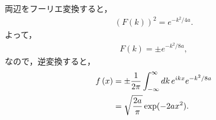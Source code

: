 両辺をフーリエ変換すると，
\begin{align}
  \left(F\left(k\right)\right)^2 = e^{-k^2/4a}.
\end{align}
よって，
\begin{align}
  F\left(k\right) = \pm e^{-k^2/8a},
\end{align}
なので，逆変換すると，
\begin{align}
 f\left(x\right) &= \pm \dfrac{1}{2\pi}\int_{-\infty}^{\infty}dk\,e^{ikx}e^{-k^2/8a} \notag \\
                 &= \sqrt{\dfrac{2a}{\pi}}\exp(-2ax^2). 
\end{align}